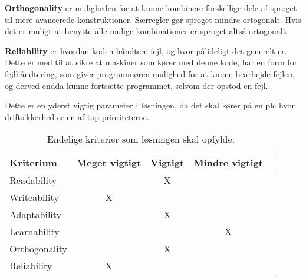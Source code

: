 \noindent\textbf{Orthogonality} er muligheden for at kunne kombinere forskellige dele af sproget til mere avancerede konstruktioner. Særregler gør sproget mindre ortogonalt. Hvis det er muligt at benytte alle mulige kombinationer er sproget altså ortogonalt.\\

\noindent\textbf{Reliability} er hvordan koden håndtere fejl, og hvor pålideligt det generelt er. Dette er med til at sikre at maskiner som kører med denne kode, har en form for fejlhåndtering, som giver programmøren mulighed for at kunne bearbejde fejlen, og derved endda kunne fortsætte programmet, selvom der opstod en fejl.

Dette er en yderst vigtig parameter i løsningen, da det skal kører på en \gls{plc} hvor driftsikkerhed er en af top prioriteterne.\\


\begin{table}[H]
\centering       
{}
\begin{tabular}{l c c c c}
\toprule
\textbf{Kriterium} & \textbf{Meget vigtigt} & \textbf{Vigtigt} & \textbf{Mindre vigtigt}  \\ \midrule
Readability        &   & X &       \\ 
Writeability       & X &   &       \\ 
Adaptability       &   & X &       \\ 
Learnability       &   &   & X     \\ 
Orthogonality      &   & X &       \\ 
Reliability        & X &   &       \\ \bottomrule
\end{tabular}
\caption{Endelige kriterier som løsningen skal opfylde.}
\label{table:kriterier}
\end{table}